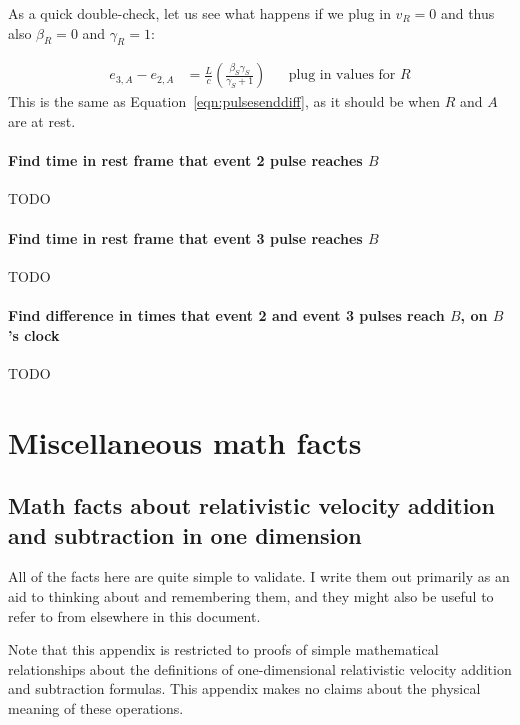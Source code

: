 \documentclass[a4paper]{article}
\theoremstyle{plain}
\theoremstyle{definition}
\begin{document}
As a quick double-check, let us see what happens if we plug in $v_R=0$
and thus also $\beta_R=0$ and $\gamma_R=1$:

\begin{align*}
e_{3,A}-e_{2,A}
  & = \frac{L}{c} \left( \frac{\beta_S\gamma_S}{\gamma_S + 1} \right) & & \text{plug in values for $R$}
\end{align*}
This is the same as Equation~\eqref{eqn:pulsesenddiff}, as it should
be when $R$ and $A$ are at rest.


\paragraph{Find time in rest frame that event 2 pulse reaches $B$}

TODO


\paragraph{Find time in rest frame that event 3 pulse reaches $B$}

TODO


\paragraph{Find difference in times that event 2 and event 3 pulses reach $B$, on $B$'s clock}

TODO



\appendix

\section{Miscellaneous math facts}

\subsection{Math facts about relativistic velocity addition and subtraction in one dimension}
\label{app:1drelvelocityadd}

All of the facts here are quite simple to validate.  I write them out
primarily as an aid to thinking about and remembering them, and they
might also be useful to refer to from elsewhere in this document.

Note that this appendix is restricted to proofs of simple mathematical
relationships about the definitions of one-dimensional relativistic
velocity addition and subtraction formulas.  This appendix makes no
claims about the physical meaning of these operations.
\end{document}
